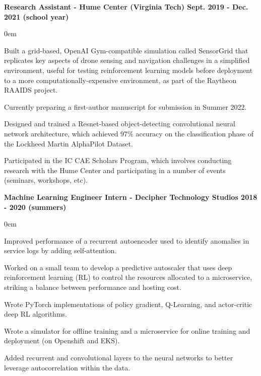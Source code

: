 \documentclass{article}
\begin{document}
\begin{center}
\begin{flushleft}
    \textbf{Research Assistant - Hume Center (Virginia Tech) \hfill Sept. 2019 - Dec. 2021 (school year)}
    \begin{compactitem}
      \itemsep0em
      \item Built a grid-based, OpenAI Gym-compatible simulation called SensorGrid that replicates key aspects of drone sensing and navigation challenges in a simplified environment, useful for testing reinforcement learning models before deployment to a more computationally-expensive environment, as part of the Raytheon RAAIDS project. 
      \item Currently preparing a first-author manuscript for submission in Summer 2022.
      \item Designed and trained a Resnet-based object-detecting convolutional neural network architecture, which achieved 97\% accuracy on the classification phase of the Lockheed Martin AlphaPilot Dataset. %
      \item Participated in the IC CAE Scholars Program, which involves conducting research with the Hume Center and participating in a number of events (seminars, workshops, etc).
    \end{compactitem}

    \textbf{Machine Learning Engineer Intern - Decipher Technology Studios \hfill 2018 - 2020 (summers)}
    \begin{compactitem}
      \itemsep0em
      \item Improved performance of a recurrent autoencoder used to identify anomalies in service logs by adding self-attention.
      \item Worked on a small team to develop a predictive autoscaler that uses deep reinforcement learning (RL) to control the resources allocated to a microservice, striking a balance between performance and hosting cost.
      \item Wrote PyTorch implementations of policy gradient, Q-Learning, and actor-critic deep RL algorithms.%
      \item Wrote a simulator for offline training and a microservice for online training and deployment (on Openshift and EKS).
      \item Added recurrent and convolutional layers to the neural networks to better leverage autocorrelation within the data.
    \end{compactitem}


\end{flushleft}
\end{center}
\end{document}
